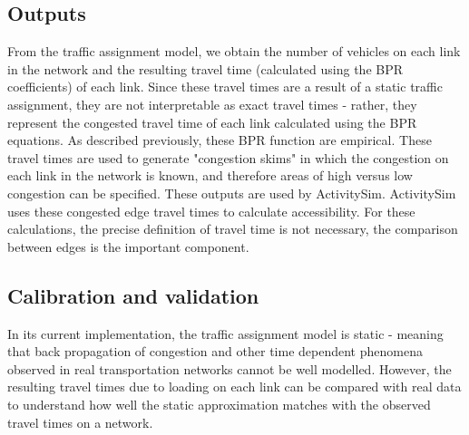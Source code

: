 \subsection{Outputs}
From the traffic assignment model, we obtain the number of vehicles on each link in the network and the resulting travel time (calculated using the BPR coefficients) of each link. Since these travel times are a result of a static traffic assignment, they are not interpretable as exact travel times - rather, they represent the congested travel time of each link calculated using the BPR equations. As described previously, these BPR function are empirical. These travel times are used to generate "congestion skims" in which the congestion on each link in the network is known, and therefore areas of high versus low congestion can be specified. These outputs are used by ActivitySim. ActivitySim uses these congested edge travel times to calculate accessibility. For these calculations, the precise definition of travel time is not necessary, the comparison between edges is the important component.


\subsection{Calibration and validation}
In its current implementation, the traffic assignment model is static - meaning that back propagation of congestion and other time dependent phenomena observed in real transportation networks cannot be well modelled. However, the resulting travel times due to loading on each link can be compared with real data to understand how well the static approximation matches with the observed travel times on a network. 
